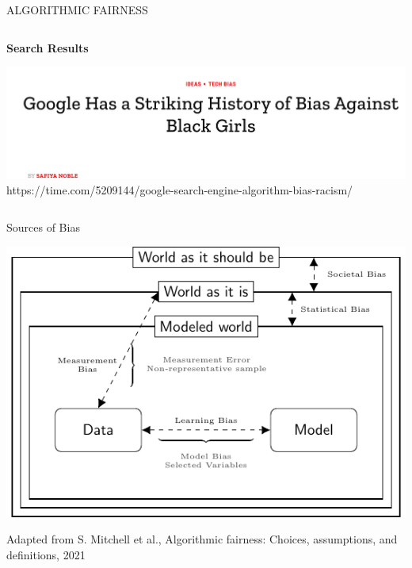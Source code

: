 \documentclass[11pt,compress,t,notes=noshow, xcolor=table]{beamer}
\begin{document}
\begin{vbframe}{ALGORITHMIC FAIRNESS}
\begin{columns}
\begin{column}{0.5\textwidth}
\begin{center}
 \vspace{1.5cm}

 \textbf{Search Results}

 \includegraphics[height=0.2\textheight]{figures/black_girls.png}
 \tiny{https://time.com/5209144/google-search-engine-algorithm-bias-racism/}
\end{center}
\end{column}
\end{columns}
\end{vbframe}




\begin{vbframe}{Sources of Bias}
\begin{center}
\includegraphics[scale=1]{figures/bias_overview.pdf}
\end{center}
\tiny{Adapted from S. Mitchell et al., Algorithmic fairness: Choices, assumptions, and definitions, 2021}
\end{vbframe}
\end{document}
